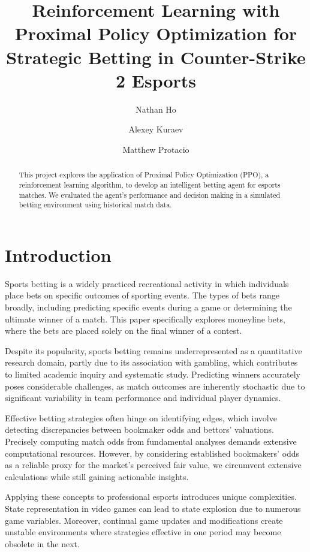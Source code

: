 \documentclass[sigconf]{acmart}
\title{Reinforcement Learning with Proximal Policy Optimization for Strategic Betting in Counter-Strike 2 Esports}
\author{Nathan Ho}
\affiliation{%
  \institution{Drexel University}
  \city{Philadelphia}
  \state{PA}
  \country{USA}
}
\author{Alexey Kuraev}
\affiliation{%
  \institution{Drexel University}
  \city{Philadelphia}
  \state{PA}
  \country{USA}
}
\author{Matthew Protacio}
\affiliation{%
  \institution{Drexel University}
  \city{Philadelphia}
  \state{PA}
  \country{USA}
}
\begin{document}

\begin{abstract}
This project explores the application of Proximal Policy Optimization (PPO), a reinforcement learning algorithm, to develop an intelligent betting agent for esports matches. We evaluated the agent's performance and decision making in a simulated betting environment using historical match data.
\end{abstract}

\maketitle

\section{Introduction}

Sports betting is a widely practiced recreational activity in which individuals place bets on specific outcomes of sporting events. The types of bets range broadly, including predicting specific events during a game or determining the ultimate winner of a match. This paper specifically explores moneyline bets, where the bets are placed solely on the final winner of a contest.

Despite its popularity, sports betting remains underrepresented as a quantitative research domain, partly due to its association with gambling, which contributes to limited academic inquiry and systematic study. Predicting winners accurately poses considerable challenges, as match outcomes are inherently stochastic due to significant variability in team performance and individual player dynamics.

Effective betting strategies often hinge on identifying edges, which involve detecting discrepancies between bookmaker odds and bettors' valuations. Precisely computing match odds from fundamental analyses demands extensive computational resources. However, by considering established bookmakers' odds as a reliable proxy for the market's perceived fair value, we circumvent extensive calculations while still gaining actionable insights.

Applying these concepts to professional esports introduces unique complexities. State representation in video games can lead to state explosion due to numerous game variables. Moreover, continual game updates and modifications create unstable environments where strategies effective in one period may become obsolete in the next.
\end{document}
